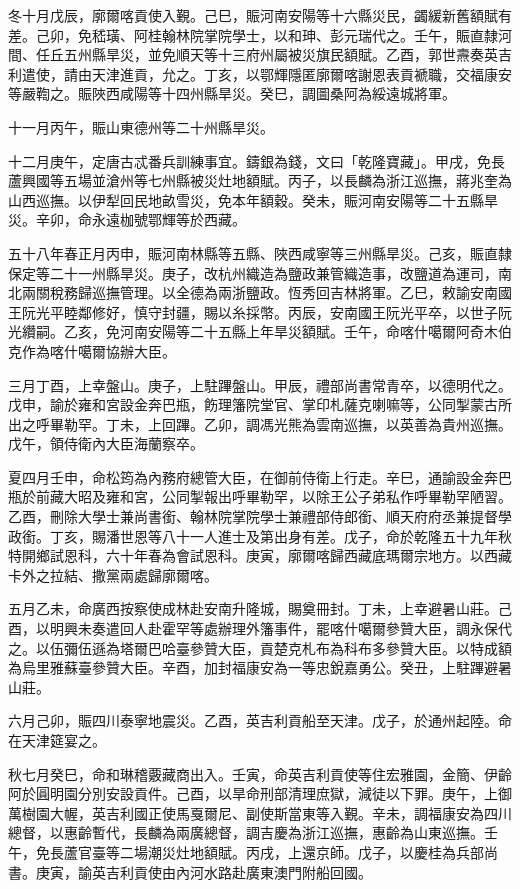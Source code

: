 \begin{pinyinscope}
冬十月戊辰，廓爾喀貢使入覲。己巳，賑河南安陽等十六縣災民，蠲緩新舊額賦有差。己卯，免嵇璜、阿桂翰林院掌院學士，以和珅、彭元瑞代之。壬午，賑直隸河間、任丘五州縣旱災，並免順天等十三府州屬被災旗民額賦。乙酉，郭世燾奏英吉利遣使，請由天津進貢，允之。丁亥，以鄂輝隱匿廓爾喀謝恩表貢褫職，交福康安等嚴鞫之。賑陜西咸陽等十四州縣旱災。癸巳，調圖桑阿為綏遠城將軍。

十一月丙午，賑山東德州等二十州縣旱災。

十二月庚午，定唐古忒番兵訓練事宜。鑄銀為錢，文曰「乾隆寶藏」。甲戌，免長蘆興國等五場並滄州等七州縣被災灶地額賦。丙子，以長麟為浙江巡撫，蔣兆奎為山西巡撫。以伊犁回民地畝雪災，免本年額穀。癸未，賑河南安陽等二十五縣旱災。辛卯，命永遠枷號鄂輝等於西藏。

五十八年春正月丙申，賑河南林縣等五縣、陜西咸寧等三州縣旱災。己亥，賑直隸保定等二十一州縣旱災。庚子，改杭州織造為鹽政兼管織造事，改鹽道為運司，南北兩關稅務歸巡撫管理。以全德為兩浙鹽政。恆秀回吉林將軍。乙巳，敕諭安南國王阮光平睦鄰修好，慎守封疆，賜以糸採幣。丙辰，安南國王阮光平卒，以世子阮光纘嗣。乙亥，免河南安陽等二十五縣上年旱災額賦。壬午，命喀什噶爾阿奇木伯克作為喀什噶爾協辦大臣。

三月丁酉，上幸盤山。庚子，上駐蹕盤山。甲辰，禮部尚書常青卒，以德明代之。戊申，諭於雍和宮設金奔巴瓶，飭理籓院堂官、掌印札薩克喇嘛等，公同掣蒙古所出之呼畢勒罕。丁未，上回蹕。乙卯，調馮光熊為雲南巡撫，以英善為貴州巡撫。戊午，領侍衛內大臣海蘭察卒。

夏四月壬申，命松筠為內務府總管大臣，在御前侍衛上行走。辛巳，通諭設金奔巴瓶於前藏大昭及雍和宮，公同掣報出呼畢勒罕，以除王公子弟私作呼畢勒罕陋習。乙酉，刪除大學士兼尚書銜、翰林院掌院學士兼禮部侍郎銜、順天府府丞兼提督學政銜。丁亥，賜潘世恩等八十一人進士及第出身有差。戊子，命於乾隆五十九年秋特開鄉試恩科，六十年春為會試恩科。庚寅，廓爾喀歸西藏底瑪爾宗地方。以西藏卡外之拉結、撒黨兩處歸廓爾喀。

五月乙未，命廣西按察使成林赴安南升隆城，賜奠冊封。丁未，上幸避暑山莊。己酉，以明興未奏遣回人赴霍罕等處辦理外籓事件，罷喀什噶爾參贊大臣，調永保代之。以伍彌伍遜為塔爾巴哈臺參贊大臣，貢楚克札布為科布多參贊大臣。以特成額為烏里雅蘇臺參贊大臣。辛酉，加封福康安為一等忠銳嘉勇公。癸丑，上駐蹕避暑山莊。

六月己卯，賑四川泰寧地震災。乙酉，英吉利貢船至天津。戊子，於通州起陸。命在天津筵宴之。

秋七月癸巳，命和琳稽覈藏商出入。壬寅，命英吉利貢使等住宏雅園，金簡、伊齡阿於圓明園分別安設貢件。己酉，以旱命刑部清理庶獄，減徒以下罪。庚午，上御萬樹園大幄，英吉利國正使馬戛爾尼、副使斯當東等入覲。辛未，調福康安為四川總督，以惠齡暫代，長麟為兩廣總督，調吉慶為浙江巡撫，惠齡為山東巡撫。壬午，免長蘆官臺等二場潮災灶地額賦。丙戌，上還京師。戊子，以慶桂為兵部尚書。庚寅，諭英吉利貢使由內河水路赴廣東澳門附船回國。


\end{pinyinscope}
